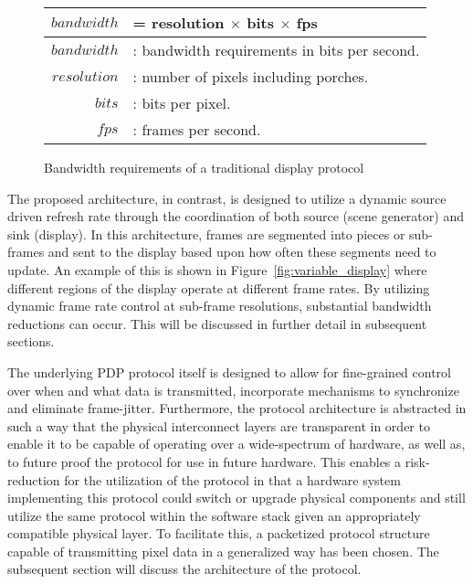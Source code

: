 \begin{figure}
    \centering
    \large
    \begin{tabular}{| r l |}
        \hline
        $$bandwidth$$ & = resolution $\times$ bits $\times$ fps \\ \hline
        $bandwidth$ & : bandwidth requirements in bits per second. \\
        $resolution$ & : number of pixels including porches. \\
        $bits$ & : bits per pixel. \\
        $fps$ & : frames per second. \\
        \hline
    \end{tabular}
    \caption{Bandwidth requirements of a traditional display protocol}
    \label{fig:bandwidth}
\end{figure}

The proposed architecture, in contrast, is designed to utilize a dynamic source driven refresh rate through the coordination of both source (scene generator) and sink (display). In this architecture, frames are segmented into pieces or sub-frames and sent to the display based upon how often these segments need to update. An example of this is shown in Figure~\ref{fig:variable_display} where different regions of the display operate at different frame rates. By utilizing dynamic frame rate control at sub-frame resolutions, substantial bandwidth reductions can occur. This will be discussed in further detail in subsequent sections.

The underlying PDP protocol itself is designed to allow for fine-grained control over when and what data is transmitted, incorporate mechanisms to synchronize and eliminate frame-jitter. Furthermore, the protocol architecture is abstracted in such a way that the physical interconnect layers are transparent in order to enable it to be capable of operating over a wide-spectrum of hardware, as well as, to future proof the protocol for use in future hardware. This enables a risk-reduction for the utilization of the protocol in that a hardware system implementing this protocol could switch or upgrade physical components and still utilize the same protocol within the software stack given an appropriately compatible physical layer. To facilitate this, a packetized protocol structure capable of transmitting pixel data in a generalized way has been chosen. The subsequent section will discuss the architecture of the protocol.
